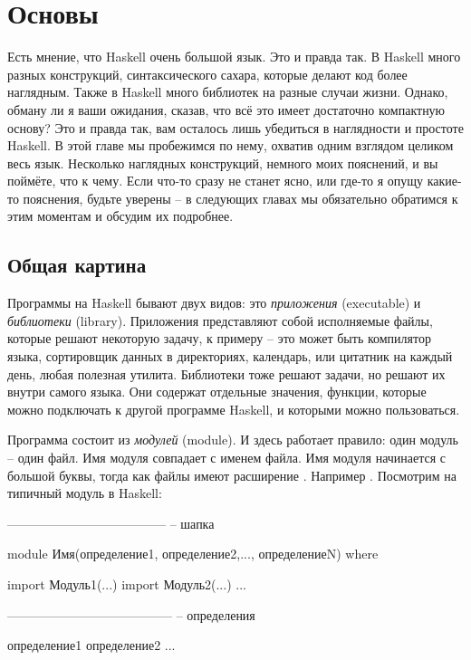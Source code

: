 \setcounter{chapter}{0}

\chapter{Основы}

Есть мнение, что Haskell очень большой язык. Это и правда так. В Haskell
много разных конструкций, синтаксического сахара, которые делают код
более наглядным. Также в Haskell много библиотек на разные случаи жизни.
Однако, обману ли я ваши ожидания, сказав, что всё это имеет достаточно
компактную основу? Это и правда так, вам осталось лишь убедиться в
наглядности и простоте Haskell. В этой главе мы пробежимся по нему,
охватив одним взглядом целиком весь язык. Несколько наглядных
конструкций, немного моих пояснений, и вы поймёте, что к чему. Если
что-то сразу не станет ясно, или где-то я опущу какие-то пояснения,
будьте уверены -- в следующих главах мы обязательно обратимся к этим
моментам и обсудим их подробнее.

\section{Общая картина}

Программы на Haskell бывают двух видов: это \emph{приложения}
(executable) и \emph{библиотеки} (library). Приложения представляют
собой исполняемые файлы, которые решают некоторую задачу, к примеру --
это может быть компилятор языка, сортировщик данных в директориях,
календарь, или цитатник на каждый день, любая полезная утилита.
Библиотеки тоже решают задачи, но решают их внутри самого языка. Они
содержат отдельные значения, функции, которые можно подключать к другой
программе Haskell, и которыми можно пользоваться.

Программа состоит из \emph{модулей} (module). И здесь работает правило:
один модуль -- один файл. Имя модуля совпадает с именем файла. Имя
модуля начинается с большой буквы, тогда как файлы имеют расширение
. Например . Посмотрим на типичный модуль в
Haskell:


\begin{code}
--------------------------------------
-- шапка

module Имя(определение1, определение2,..., определениеN) where

import Модуль1(...)
import Модуль2(...)
...

---------------------------------------
-- определения

определение1
определение2
...
\end{code}

